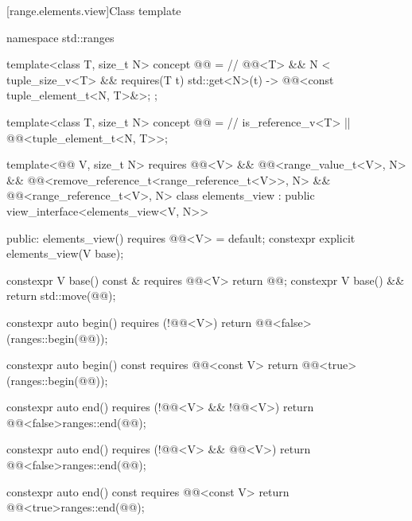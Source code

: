 [range.elements.view]{Class template }

%
%
%
%
%
\begin{codeblock}
namespace std::ranges {
  template<class T, size_t N>
  concept @@ =                   // \expos
    @@<T> && N < tuple_size_v<T> &&
    requires(T t) {
      { std::get<N>(t) } -> @@<const tuple_element_t<N, T>&>;
    };

  template<class T, size_t N>
  concept @@ =                  // \expos
    is_reference_v<T> || @@<tuple_element_t<N, T>>;

  template<@@ V, size_t N>
    requires @@<V> && @@<range_value_t<V>, N> &&
             @@<remove_reference_t<range_reference_t<V>>, N> &&
             @@<range_reference_t<V>, N>
  class elements_view : public view_interface<elements_view<V, N>> {
  public:
    elements_view() requires @@<V> = default;
    constexpr explicit elements_view(V base);

    constexpr V base() const & requires @@<V> { return @@; }
    constexpr V base() && { return std::move(@@); }

    constexpr auto begin() requires (!@@<V>)
    { return @@<false>(ranges::begin(@@)); }

    constexpr auto begin() const requires @@<const V>
    { return @@<true>(ranges::begin(@@)); }

    constexpr auto end() requires (!@@<V> && !@@<V>)
    { return @@<false>{ranges::end(@@)}; }

    constexpr auto end() requires (!@@<V> && @@<V>)
    { return @@<false>{ranges::end(@@)}; }

    constexpr auto end() const requires @@<const V>
    { return @@<true>{ranges::end(@@)}; }

}}
\end{codeblock}
